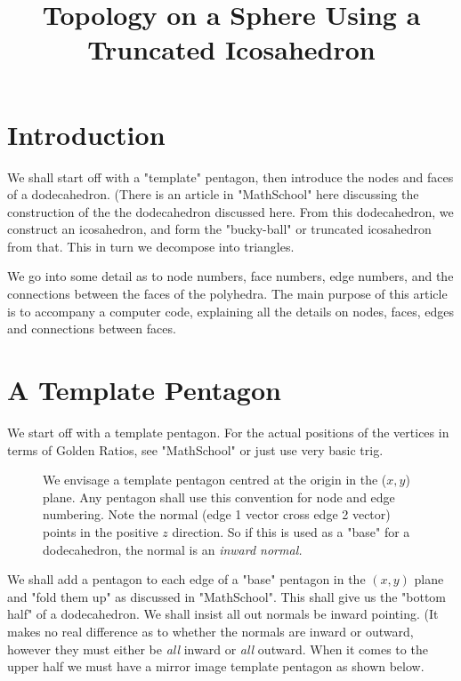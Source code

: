 \documentclass[12pt]{article}
\begin{document}
\thispagestyle{empty}

\title{Topology on a Sphere Using a Truncated Icosahedron}

\maketitle

\tableofcontents

\section{Introduction}

We shall start off with a "template" pentagon, then introduce the nodes and
faces of a dodecahedron. (There is an article in "MathSchool" here discussing
the construction of the the dodecahedron discussed here. From this dodecahedron,
we construct an icosahedron, and form the "bucky-ball" or truncated icosahedron
from that. This in turn we decompose into triangles.

We go into some detail as to node numbers, face numbers, edge numbers, and the
 connections between the faces of the polyhedra. The main purpose of this article
is to accompany a computer code, explaining all the details on nodes, faces, edges
and connections between faces.


\section{A Template Pentagon}

We start off with a template pentagon. For the actual positions of the vertices
 in terms of Golden Ratios, see "MathSchool" or just use very basic trig.
\vspace*{10cm}
\begin{figure}[htb]
\caption{ We envisage a template pentagon centred at the origin in the 
($x,y$) plane. Any pentagon shall use this convention for node and edge numbering.
Note the normal (edge 1 vector  cross edge 2 vector) points in the positive $z$
direction. So if this is used as a "base" for a dodecahedron, the normal is an {\it inward
normal.}}
\end{figure}

We shall add a pentagon to each edge of a "base" pentagon in the $(x,y)$ plane and
"fold them up" as discussed in "MathSchool". This shall give us the "bottom half"
of a dodecahedron. We shall insist all out normals be inward pointing. (It makes
no real difference as to whether the normals are inward or outward, however they
must either be {\it all} inward or {\it all} outward. When it comes to the upper half
we must have a mirror image template pentagon as shown below.
\end{document}
